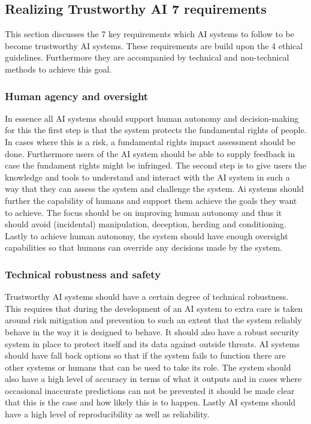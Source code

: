 \subsection{Realizing Trustworthy AI 7 requirements}
This section discusses the 7 key requirements which AI systems to follow to be become trustworthy AI systems. These requirements are build upon the 4 ethical guidelines. Furthermore they are accompanied by technical and non-technical methods to achieve this goal.
\subsubsection*{Human agency and oversight}
In essence all AI systems should support human autonomy and decision-making for this the first step is that the system protects the fundamental rights of people. In cases where this is a risk, a fundamental rights impact assessment should be done. Furthermore users of the AI system should be able to supply feedback in case the fundament rights might be infringed. The second step is to give users the knowledge and tools to understand and interact with the AI system in such a way that they can assess the system and challenge the system. Ai systems should further the capability of humans and support them achieve the goals they want to achieve. The focus should be on improving human autonomy and thus it should avoid (incidental) manipulation, deception, herding and conditioning. Lastly to achieve human autonomy, the system should have enough oversight capabilities so that humans can override any decisions made by the system.
\subsubsection*{Technical robustness and safety}
Trustworthy AI systems should have a certain degree of technical robustness. This requires that during the development of an AI system to extra care is taken around risk mitigation and prevention to such an extent that the system reliably behave in the way it is designed to behave. It should also have a robust security system in place to protect itself and its data against outside threats. AI systems should have fall back options so that if the system fails to function there are other systems or humans that can be used to take its role. The system should also have a high level of accuracy in terms of what it outputs and in cases where occasional inaccurate predictions can not be prevented it should be made clear that this is the case and how likely this is to happen. Lastly AI systems should have a high level of reproducibility as well as reliability. 
